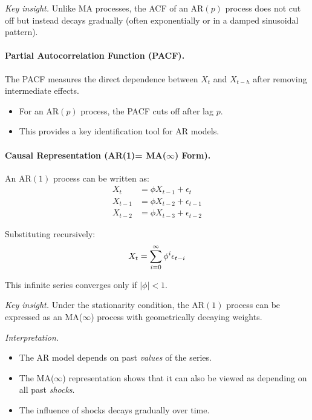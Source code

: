 \documentclass[10pt,a4paper]{article}
\begin{document}
	\textit{Key insight.} Unlike MA processes, the ACF of an AR$(p)$ process does not cut off but instead decays gradually (often exponentially or in a damped sinusoidal pattern).
	
	\paragraph{Partial Autocorrelation Function (PACF).}
	
	The PACF measures the direct dependence between $X_t$ and $X_{t-h}$ after removing intermediate effects.
	
	\begin{itemize}
	\item For an AR$(p)$ process, the PACF cuts off after lag $p$.
	\item This provides a key identification tool for AR models.
	\end{itemize}
	
	\paragraph{Causal Representation (AR(1)= MA($\infty$) Form).}
	
	An AR$(1)$ process can be written as:
	\begin{align*}
	X_t &= \phi X_{t-1} + \epsilon_t\\
	X_{t-1} &= \phi X_{t-2} + \epsilon_{t-1}\\
	X_{t-2} &= \phi X_{t-3} + \epsilon_{t-2}
	\end{align*}
	
	
	Substituting recursively:
	\begin{align*}
	\large X_t = \sum_{i=0}^{\infty} \phi^i \epsilon_{t-i}
	\end{align*}
	
	This infinite series converges only if $|\phi| < 1$.
	
	\textit{Key insight.} Under the stationarity condition, the AR$(1)$ process can be expressed as an MA($\infty$) process with geometrically decaying weights.
	
	\textit{Interpretation.}
	\begin{itemize}
	\item The AR model depends on past \textit{values} of the series.
	\item The MA($\infty$) representation shows that it can also be viewed as depending on all past \textit{shocks}.
	\item The influence of shocks decays gradually over time.
	\end{itemize}
	
\end{document}
